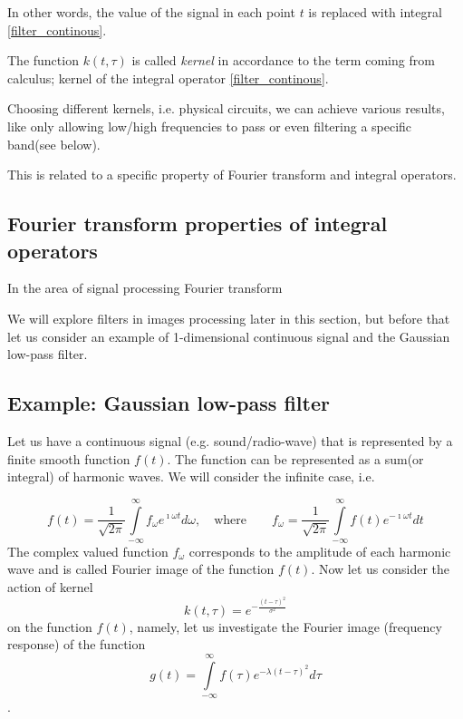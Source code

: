 \documentclass[11pt]{book}
\begin{document}
In other words, the value of the signal in each point $t$ is replaced with integral \eqref{filter_continous}. 

The function $k(t,\tau)$ is called {\it kernel} in accordance to the term coming from calculus; kernel of the integral operator \eqref{filter_continous}.

Choosing different kernels, i.e. physical circuits, we can achieve various results, like only allowing low/high frequencies to pass or even filtering a specific band(see below). 

This is related to a specific property of Fourier transform and integral operators.

\subsection{Fourier transform properties of integral operators}

In the area of signal processing Fourier transform

 We will explore filters in images processing later in this section, but before that let us consider an example of 1-dimensional continuous signal and the Gaussian low-pass filter. 

\subsection{Example: Gaussian low-pass filter}

Let us have a continuous signal (e.g. sound/radio-wave) that is represented by a finite smooth function $f(t)$. The function can be represented as a sum(or integral) of harmonic waves. We will consider the infinite case, i.e.

\begin{equation}
f(t) = \frac{1}{\sqrt{2\pi}}\int\limits_{-\infty}^\infty f_{\omega} e^{\imath\omega t} d\omega,\quad \text{where} \qquad f_{\omega} =\frac{1}{\sqrt{2\pi}} \int\limits_{-\infty}^\infty f(t) e^{-\imath\omega t} dt
\end{equation}      
The complex valued function $f_{\omega}$ corresponds to the amplitude of each harmonic wave and is called Fourier image of the function $f(t)$.
Now let us consider the action of kernel 
\begin{equation}
k(t,\tau) = e^{-\frac{(t-\tau)^2}{\sigma^2}}
\end{equation}
 on the function $f(t)$, namely, let us investigate the Fourier image (frequency response) of the function
\begin{equation}
g(t) = \int\limits_{-\infty}^\infty f(\tau)e^{-\lambda(t-\tau)^2} d\tau 
\end{equation}.
\end{document}
